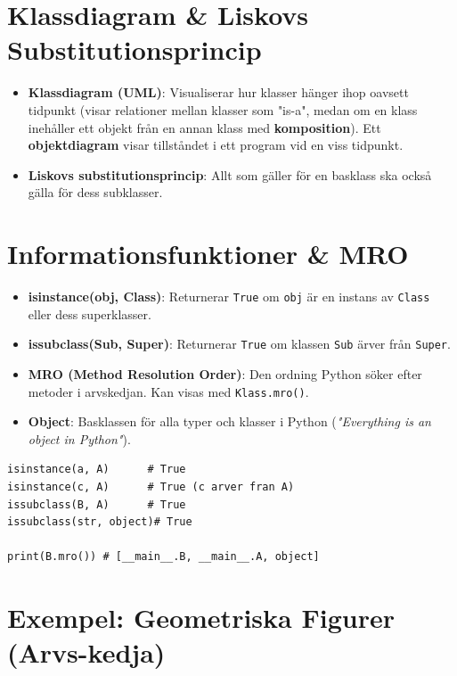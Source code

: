 \documentclass[10pt,a4paper]{report}
\begin{document}
\section{Klassdiagram \& Liskovs Substitutionsprincip}

\begin{itemize}[leftmargin=*]
  \item \textbf{Klassdiagram (UML)}: Visualiserar hur klasser hänger ihop oavsett tidpunkt (visar relationer mellan klasser som "is-a", medan om en klass inehåller ett objekt från en annan klass med \textbf{komposition}). Ett \textbf{objektdiagram} visar tillståndet i ett program vid en viss tidpunkt.
  \item \textbf{Liskovs substitutionsprincip}: Allt som gäller för en basklass ska också gälla för dess subklasser.
\end{itemize}

\section{Informationsfunktioner \& MRO}

\begin{itemize}[leftmargin=*]
  \item \textbf{isinstance(obj, Class)}: Returnerar \texttt{True} om \texttt{obj} är en instans av \texttt{Class} eller dess superklasser.
  \item \textbf{issubclass(Sub, Super)}: Returnerar \texttt{True} om klassen \texttt{Sub} ärver från \texttt{Super}.
  \item \textbf{MRO (Method Resolution Order)}: Den ordning Python söker efter metoder i arvskedjan. Kan visas med \texttt{Klass.mro()}.
  \item \textbf{Object}: Basklassen för alla typer och klasser i Python (\textit{"Everything is an object in Python"}).
\end{itemize}

\begin{lstlisting}
isinstance(a, A)      # True
isinstance(c, A)      # True (c arver fran A)
issubclass(B, A)      # True
issubclass(str, object)# True

print(B.mro()) # [__main__.B, __main__.A, object]
\end{lstlisting}

\section{Exempel: Geometriska Figurer (Arvs-kedja)}
\end{document}
